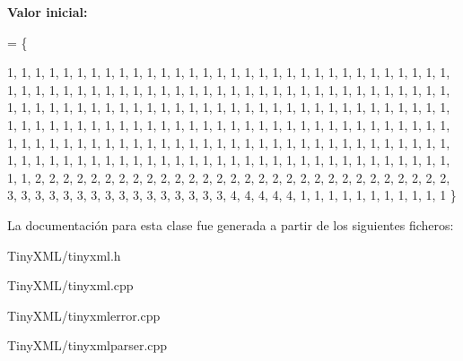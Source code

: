 {\bfseries Valor inicial\-:}
\begin{DoxyCode}
= 
\{
    
        1,  1,  1,  1,  1,  1,  1,  1,  1,  1,  1,  1,  1,  1,  1,  1,  
        1,  1,  1,  1,  1,  1,  1,  1,  1,  1,  1,  1,  1,  1,  1,  1,  
        1,  1,  1,  1,  1,  1,  1,  1,  1,  1,  1,  1,  1,  1,  1,  1,  
        1,  1,  1,  1,  1,  1,  1,  1,  1,  1,  1,  1,  1,  1,  1,  1,  
        1,  1,  1,  1,  1,  1,  1,  1,  1,  1,  1,  1,  1,  1,  1,  1,  
        1,  1,  1,  1,  1,  1,  1,  1,  1,  1,  1,  1,  1,  1,  1,  1,  
        1,  1,  1,  1,  1,  1,  1,  1,  1,  1,  1,  1,  1,  1,  1,  1,  
        1,  1,  1,  1,  1,  1,  1,  1,  1,  1,  1,  1,  1,  1,  1,  1,  
        1,  1,  1,  1,  1,  1,  1,  1,  1,  1,  1,  1,  1,  1,  1,  1,  
        1,  1,  1,  1,  1,  1,  1,  1,  1,  1,  1,  1,  1,  1,  1,  1,  
        1,  1,  1,  1,  1,  1,  1,  1,  1,  1,  1,  1,  1,  1,  1,  1,  
        1,  1,  1,  1,  1,  1,  1,  1,  1,  1,  1,  1,  1,  1,  1,  1,  
        1,  1,  2,  2,  2,  2,  2,  2,  2,  2,  2,  2,  2,  2,  2,  2,  
        2,  2,  2,  2,  2,  2,  2,  2,  2,  2,  2,  2,  2,  2,  2,  2,  
        3,  3,  3,  3,  3,  3,  3,  3,  3,  3,  3,  3,  3,  3,  3,  3,  
        4,  4,  4,  4,  4,  1,  1,  1,  1,  1,  1,  1,  1,  1,  1,  1   
\}
\end{DoxyCode}


La documentación para esta clase fue generada a partir de los siguientes ficheros\-:\begin{DoxyCompactItemize}
\item 
Tiny\-X\-M\-L/tinyxml.\-h\item 
Tiny\-X\-M\-L/tinyxml.\-cpp\item 
Tiny\-X\-M\-L/tinyxmlerror.\-cpp\item 
Tiny\-X\-M\-L/tinyxmlparser.\-cpp\end{DoxyCompactItemize}
